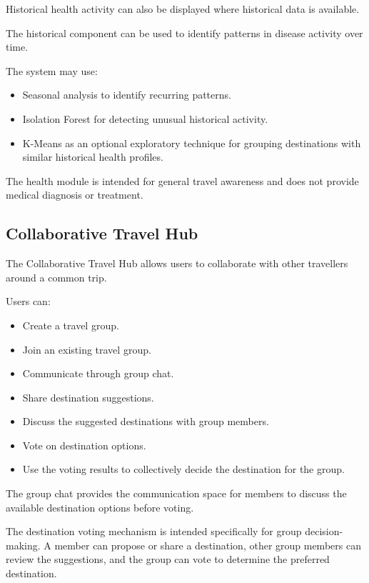 \documentclass[11pt,a4paper]{article}
\begin{document}
Historical health activity can also be displayed where historical data is available.

The historical component can be used to identify patterns in disease activity over time.

The system may use:

\begin{itemize}
\item Seasonal analysis to identify recurring patterns.
\item Isolation Forest for detecting unusual historical activity.
\item K-Means as an optional exploratory technique for grouping destinations with similar historical health profiles.
\end{itemize}

The health module is intended for general travel awareness and does not provide medical diagnosis or treatment.


\subsection{Collaborative Travel Hub}

The Collaborative Travel Hub allows users to collaborate with other travellers around a common trip.

Users can:

\begin{itemize}
\item Create a travel group.
\item Join an existing travel group.
\item Communicate through group chat.
\item Share destination suggestions.
\item Discuss the suggested destinations with group members.
\item Vote on destination options.
\item Use the voting results to collectively decide the destination for the group.
\end{itemize}

The group chat provides the communication space for members to discuss the available destination options before voting.

The destination voting mechanism is intended specifically for group decision-making. A member can propose or share a destination, other group members can review the suggestions, and the group can vote to determine the preferred destination.
\end{document}
